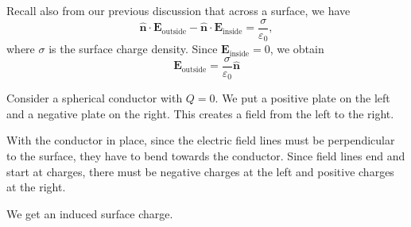 \documentclass[a4paper]{article}
\begin{document}
Recall also from our previous discussion that across a surface, we have
\[
  \hat{\mathbf{n}}\cdot \mathbf{E}_\text{outside} - \hat{\mathbf{n}}\cdot \mathbf{E}_\text{inside} = \frac{\sigma}{\varepsilon_0},
\]
where $\sigma$ is the surface charge density. Since $\mathbf{E}_\text{inside} = 0$, we obtain
\[
  \mathbf{E}_\text{outside} = \frac{\sigma}{\varepsilon_0}\hat{\mathbf{n}}
\]
\begin{eg}
  Consider a spherical conductor with $Q = 0$. We put a positive plate on the left and a negative plate on the right. This creates a field from the left to the right.

  With the conductor in place, since the electric field lines must be perpendicular to the surface, they have to bend towards the conductor. Since field lines end and start at charges, there must be negative charges at the left and positive charges at the right.
  \begin{center}
  \end{center}
  We get an induced surface charge.
\end{eg}
\end{document}
